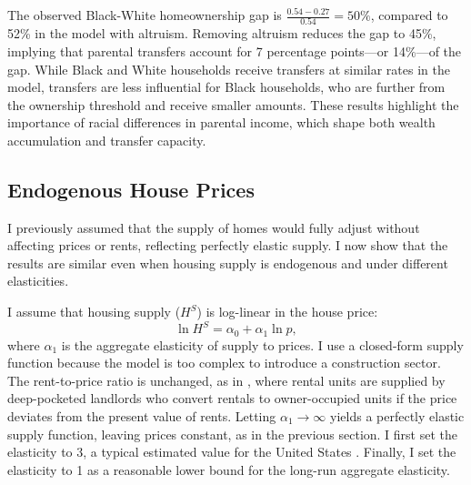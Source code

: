\documentclass[12pt]{article}
\begin{document}
The observed Black-White homeownership gap is $\frac{0.54 - 0.27}{0.54} = 50\%$, compared to 52\% in the model with altruism. Removing altruism reduces the gap to 45\%, implying that parental transfers account for 7 percentage points---or 14\%---of the gap. While Black and White households receive transfers at similar rates in the model, transfers are less influential for Black households, who are further from the ownership threshold and receive smaller amounts. These results highlight the importance of racial differences in parental income, which shape both wealth accumulation and transfer capacity. 

\subsection{Endogenous House Prices}\label{sec:endoprice}
I previously assumed that the supply of homes would fully adjust without affecting prices or rents, reflecting perfectly elastic supply. I now show that the results are similar even when housing supply is endogenous and under different elasticities.

I assume that housing supply ($H^S$) is log-linear in the house price:
\begin{equation}
\label{eq:hsupply}
\ln H^S = \alpha_0 + \alpha_1 \ln p,
\end{equation}
where $\alpha_1$ is the aggregate elasticity of supply to prices. I use a closed-form supply function because the model is too complex to introduce a construction sector. The rent-to-price ratio is unchanged, as in \cite{Kaplan2020}, where rental units are supplied by deep-pocketed landlords who convert rentals to owner-occupied units if the price deviates from the present value of rents. Letting $\alpha_1\to\infty$ yields a perfectly elastic supply function, leaving prices constant, as in the previous section. I first set the elasticity to 3, a typical estimated value for the United States \cite[see e.g.,][]{saiz2010geographic,aastveit2023changing}. Finally, I set the elasticity to 1 as a reasonable lower bound for the long-run aggregate elasticity.
\end{document}
